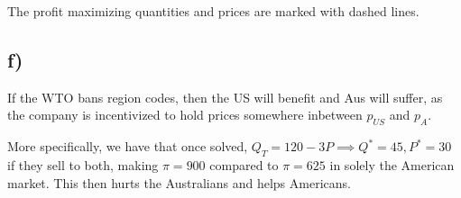 \documentclass[12pt,letterpaper]{article}
\theoremstyle{definition}
\begin{document}
The profit maximizing quantities and prices are marked with dashed lines.

\subsection*{f)}

If the WTO bans region codes, then the US will benefit and Aus will suffer, as
the company is incentivized to hold prices somewhere inbetween $p_{US}$ and $p_A$.

More specifically, we have that once solved, $Q_T = 120 - 3P \implies Q^* = 45,
P^* = 30$ if they sell to both, making $\pi = 900$ compared to $\pi = 625$ in
solely the American market. This then hurts the Australians and helps Americans.
\end{document}
